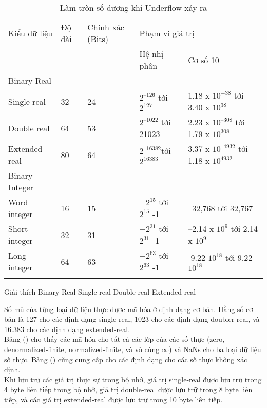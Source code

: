 		\begin{longtable}{|l|l|p{2cm}|l|l|}
		 \hline
		 	Kiểu dữ liệu & Độ dài & Chính xác (Bits) & \multicolumn{2}{l|}{Phạm vi giá trị}\\
		 	\cline{4-5}
		 	& & &  Hệ nhị phân & Cơ số 10 \\		
		\hline	
			Binary Real & & & & \\
			Single real &32 &24 & $2^{–126}$ tới $2^{127}$ & 1.18 x $10^{-38}$ tới 3.40 x $10^{38}$\\
			Double real &64 & 53 & $2^{–1022}$ tới 21023 & 2.23 x $10^{–308}  $ tới 1.79 x $10^{308} $\\
			Extended real	&	80 &64&$2^{–16382}  $tới$ 2^{16383} $  & 3.37 x $ 10^{–4932} $ tới 1.18 x $10^{4932}  $\\
		 \hline
		 Binary Integer & & & &\\
			Word integer &16 &15 & $-2 ^{15} $ tới  $ 2^{15} $ -1  &  –32,768   tới 32,767 \\
			Short integer &32 &31 &$ -2^{31} $ tới  $ 2^{31} $  -1 & –2.14 x $10 ^{9 } $ tới 2.14 x $10 ^{9} $\\
			Long integer &64 &63  &$ -2^{63} $ tới  $ 2^{63} $ -1  & -9.22 $ 10^{18} $ tới 9.22  $10 ^{18} $\\
		 \hline					
		 		\caption{Làm tròn số dương khi Underflow xảy ra}
				 \label{tb:DLFPU}
		\end{longtable}
		
		Giải thích 
		Binary Real
		Single real
		Double real 
		Extended real		
		
	Số mũ của từng loại dữ liệu thực được mã hóa ở định dạng cơ bản. Hằng số cơ bản là 127 cho các định dạng single-real, 1023 cho các định dạng doubler-real, và 16.383 cho các định dạng extended-real.\\
	
	Bảng () cho thấy các mã hóa cho tất cả các lớp của các số thực (zero, denormalized-finite, normalized-finite, và vô cùng $\mathbb{\infty}$) và NaNs cho ba loại dữ liệu số thực. Bảng () cũng cung cấp cho các định dạng cho các số thực không xác định.\\

	Khi lưu trữ các giá trị thực sự trong bộ nhớ, giá trị single-real được lưu trữ trong 4 byte liên tiếp trong bộ nhớ, giá trị double-real được lưu trữ trong 8 byte liên tiếp, và các giá trị extended-real được lưu trữ trong 10 byte liên tiếp.\\

